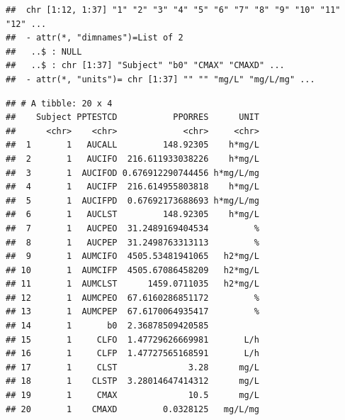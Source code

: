 \documentclass[12pt,]{krantz}
\newenvironment{Shaded}{\begin{snugshade}}{\end{snugshade}}
\newcommand{\KeywordTok}[1]{\textcolor[rgb]{0.13,0.29,0.53}{\textbf{#1}}}
\newcommand{\DataTypeTok}[1]{\textcolor[rgb]{0.13,0.29,0.53}{#1}}
\newcommand{\DecValTok}[1]{\textcolor[rgb]{0.00,0.00,0.81}{#1}}
\newcommand{\StringTok}[1]{\textcolor[rgb]{0.31,0.60,0.02}{#1}}
\newcommand{\OperatorTok}[1]{\textcolor[rgb]{0.81,0.36,0.00}{\textbf{#1}}}
\newcommand{\NormalTok}[1]{#1}
\theoremstyle{definition}
\theoremstyle{definition}
\theoremstyle{definition}
\theoremstyle{remark}
\begin{document}
\begin{verbatim}
##  chr [1:12, 1:37] "1" "2" "3" "4" "5" "6" "7" "8" "9" "10" "11" "12" ...
##  - attr(*, "dimnames")=List of 2
##   ..$ : NULL
##   ..$ : chr [1:37] "Subject" "b0" "CMAX" "CMAXD" ...
##  - attr(*, "units")= chr [1:37] "" "" "mg/L" "mg/L/mg" ...
\end{verbatim}

\begin{Shaded}
\end{Shaded}

\begin{verbatim}
## # A tibble: 20 x 4
##    Subject PPTESTCD           PPORRES      UNIT
##      <chr>    <chr>             <chr>     <chr>
##  1       1   AUCALL         148.92305    h*mg/L
##  2       1   AUCIFO  216.611933038226    h*mg/L
##  3       1  AUCIFOD 0.676912290744456 h*mg/L/mg
##  4       1   AUCIFP  216.614955803818    h*mg/L
##  5       1  AUCIFPD  0.67692173688693 h*mg/L/mg
##  6       1   AUCLST         148.92305    h*mg/L
##  7       1   AUCPEO  31.2489169404534         %
##  8       1   AUCPEP  31.2498763313113         %
##  9       1  AUMCIFO  4505.53481941065   h2*mg/L
## 10       1  AUMCIFP  4505.67086458209   h2*mg/L
## 11       1  AUMCLST      1459.0711035   h2*mg/L
## 12       1  AUMCPEO  67.6160286851172         %
## 13       1  AUMCPEP  67.6170064935417         %
## 14       1       b0  2.36878509420585          
## 15       1     CLFO  1.47729626669981       L/h
## 16       1     CLFP  1.47727565168591       L/h
## 17       1     CLST              3.28      mg/L
## 18       1    CLSTP  3.28014647414312      mg/L
## 19       1     CMAX              10.5      mg/L
## 20       1    CMAXD         0.0328125   mg/L/mg
\end{verbatim}
\end{document}
